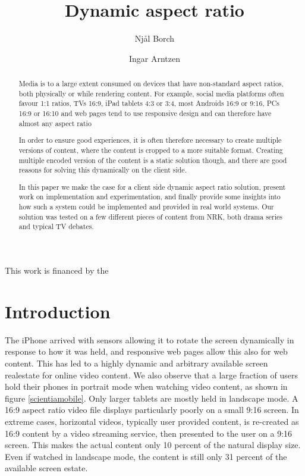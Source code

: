 \documentclass[sigconf, review=false]{acmart}
\title{Dynamic aspect ratio}
\author{Njål Borch}
\affiliation{NORCE}
\author{Ingar Arntzen}
\affiliation{NORCE}
\begin{document}
\begin{acks}
This work is financed by the

\end{acks}

 
\begin{abstract}

Media is to a large extent consumed on devices that have non-standard aspect
ratios, both physically or while rendering content. For example, social media
platforms often favour 1:1 ratios, TVs 16:9, iPad tablets 4:3 or 3:4, most
Androids 16:9 or 9:16, PCs 16:9 or 16:10 and web pages tend to use responsive
design and can therefore have almost any aspect ratio

In order to ensure good experiences, it is often therefore necessary to create
multiple versions of content, where the content is cropped to a more suitable
format. Creating multiple encoded version of the content is a static solution
though, and there are good reasons for solving this dynamically on the client
side. 

In this paper we make the case for a client side dynamic aspect ratio
solution, present work on implementation and experimentation, and finally
provide some insights into how such a system could be implemented and
provided in real world systems. Our solution was tested on a few different
pieces of content from NRK, both drama series and typical TV debates.
\end{abstract}

\maketitle
\shortauthors

\section{Introduction}\label{introduction}

The iPhone arrived with sensors allowing it to rotate the screen dynamically
in response to how it was held, and responsive web pages allow this also for
web content. This has led to a highly dynamic and arbitrary available screen
realestate for online video content. We also observe that a large fraction of
users hold their phones in portrait mode when watching video content, as
shown in figure \ref{scientiamobile}. Only larger tablets are mostly held in
landscape mode. A 16:9 aspect ratio video file displays particularly poorly
on a small 9:16 screen. In extreme cases, horizontal videos, typically user
provided content, is re-created as 16:9 content by a video streaming service,
then presented to the user on a 9:16 screen. This makes the actual content
only 10 percent of the natural display size. Even if watched in landscape
mode, the content is still only 31 percent of the available screen estate. 
\end{document}
